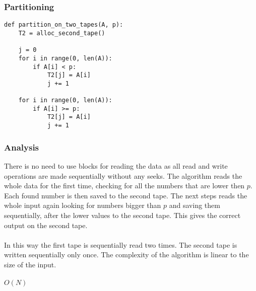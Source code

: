 \documentclass{article}
\begin{document}
\subsubsection*{Partitioning}
\begin{verbatim}
def partition_on_two_tapes(A, p):
    T2 = alloc_second_tape()

    j = 0
    for i in range(0, len(A)):
        if A[i] < p:
            T2[j] = A[i]
            j += 1

    for i in range(0, len(A)):
        if A[i] >= p:
            T2[j] = A[i]
            j += 1
\end{verbatim}

\subsubsection*{Analysis}
There is no need to use blocks for reading the data as all read and write operations are made sequentially without any seeks.
The algorithm reads the whole data for the first time, checking for all the numbers that are lower then $p$. Each found number is then saved to the second tape. The next steps reads the whole input again looking for numbers bigger than $p$ and saving them sequentially, after the lower values to the second tape. This gives the correct output on the second tape.\\\\
In this way the first tape is sequentially read two times. The second tape is written sequentially only once. The complexity of the algorithm is linear to the size of the input.\\\\
$O(N)$
\end{document}
